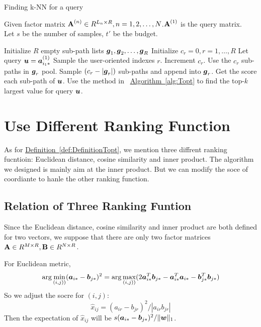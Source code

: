 \documentclass[letterpaper]{article}
\newcommand{\V}[1]{{\bm{{\MakeLowercase{#1}}}}}
\newcommand{\VnC}[3]{\V{#1}^{(#2)}_{#3}}
\newcommand{\M}[1]{{\bm{\mathbf{\MakeUppercase{#1}}}}}
\newcommand{\norm}[2]{\|#1\|_{#2}}
\newcommand{\Def}[1] {\hyperref[def:#1] {Definition~\ref*{def:#1}}}
\newcommand{\Alg}[1] {\hyperref[alg:#1] {Algorithm~\ref*{alg:#1}}}
\begin{document}
\begin{algorithm}[t]
    \caption{Finding k-NN for a query}\label{alg:QuerySampling}
        Given factor matrix $\M{A}^{(n)}\in R^{L_n\times R}, n = 1,2,\ldots,N$.$\M{A}^{(1)}$ is the query matrix.\\
        Let $s$ be the number of samples, $t'$ be the budget.
    \begin{algorithmic}[1]
    \State Initialize $R$ empty sub-path lists $\V{g}_1,\V{g}_2,\ldots,\V{g}_R$
    \State Initialize $c_r = 0,r= 1,\ldots,R$
    \State Let query $\V{u}=\VnC{a}{1}{i_1*}$
    \State Sample the user-oriented indexes $r$. \label{line:Indexes}
    \State  Increment $c_r$.
    \EndFor
    \If {$c_r\leq |\V{g}_r|$ }
    \State Use the $c_r$ sub-paths in $\V{g}_r$ pool.
    \Else
    \State Sample $(c_r - |\V{g}_r|)$ sub-paths and append into $\V{g}_r$.
    \EndIf
    \State Get the score each sub-path of $\V{u}$.
    \State Use the method in ~\Alg{Topt} to find the top-$k$ largest value for query $\V{u}$.
    \EndFor
    \EndFor
    \end{algorithmic}
\end{algorithm}


\section{Use Different Ranking Function}
As for \Def{DefinitionTopt}, we mention three diffrent ranking fucntioin: Euclidean distance, cosine similarity and inner product. The algorithm we designed is  mainly aim at the inner product. But we can modify the soce of coordiante to hanle the other ranking function.

\subsection{Relation of Three Ranking Funtion}
Since the Euclidean distance, cosine similarity and inner product are both defined for two vectors, we suppose that there are only two factor matrices $\M{A}\in R^{M\times R},\M{B}\in R^{N\times R}$. 

For Euclidean metric,
\[
\arg\min_{(i,j))}(\V{a}_{i*}-\V{b}_{j*})^2 
= \arg\max_{(i,j))}(2\V{a}_{i*}^T\V{b}_{j*}
- \V{a}_{i*}^T\V{a}_{i*}
- \V{b}_{j*}^T\V{b}_{j*})
\]
So we adjust the socre for $(i,j)$:
\[
\widehat{x}_{ij} = (a_{ir}-b_{jr})^2/|a_{ir}b_{jr}|
\]
Then the expectation of $\widehat{x}_{ij}$ will be $s(\V{a}_{i*}-\V{b}_{j*})^2/\norm{\V{w}}{1}$.
\end{document}
